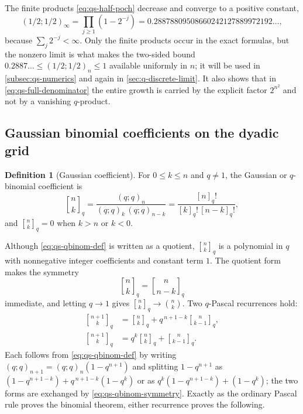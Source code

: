 \documentclass[11pt,oneside]{article}
\theoremstyle{definition}
\newtheorem{definition}[theorem]{Definition}
\theoremstyle{remark}
\newcommand{\qbinom}[3]{\genfrac{[}{]}{0pt}{}{#1}{#2}_{#3}}
\begin{document}
The finite products \eqref{eq:qs-half-poch} decrease and converge to a positive constant,
\begin{equation}
 (1/2;1/2)_\infty=\prod_{j\ge1}\left(1-2^{-j}\right)
 =0.28878809508660242127889972192\ldots,                  \label{eq:qs-half-poch-infinite}
\end{equation}
because $\sum_j2^{-j}<\infty$.  Only the finite products occur in the exact formulas, but the
nonzero limit is what makes the two-sided bound
$0.2887\ldots\le(1/2;1/2)_n\le1$ available uniformly in $n$; it will be used in
\cref{subsec:qs-numerics} and again in \cref{sec:q-discrete-limit}.  It also shows that in
\eqref{eq:qs-full-denominator} the entire growth is carried by the explicit factor $2^{n^2}$
and not by a vanishing $q$-product.

\subsection{Gaussian binomial coefficients on the dyadic grid}
\label{subsec:qs-gaussian}

\begin{definition}[Gaussian coefficient]
For $0\le k\le n$ and $q\ne1$, the Gaussian or $q$-binomial coefficient is
\begin{equation}
 \qbinom nkq=\frac{(q;q)_n}{(q;q)_k\,(q;q)_{n-k}}
 =\frac{[n]_q!}{[k]_q!\,[n-k]_q!},                        \label{eq:qs-qbinom-def}
\end{equation}
and $\qbinom nkq=0$ when $k>n$ or $k<0$.
\end{definition}

Although \eqref{eq:qs-qbinom-def} is written as a quotient, $\qbinom nkq$ is a polynomial in
$q$ with nonnegative integer coefficients and constant term $1$.  The quotient form makes the
symmetry
\begin{equation}
 \qbinom nkq=\qbinom n{n-k}q                              \label{eq:qs-qbinom-symmetry}
\end{equation}
immediate, and letting $q\to1$ gives $\qbinom nkq\to\binom nk$.  Two $q$-Pascal recurrences
hold:
\begin{align}
 \qbinom{n+1}kq&=\qbinom nkq+q^{\,n+1-k}\qbinom n{k-1}q,  \label{eq:qs-qpascal-one}\\
 \qbinom{n+1}kq&=q^{k}\qbinom nkq+\qbinom n{k-1}q.        \label{eq:qs-qpascal-two}
\end{align}
Each follows from \eqref{eq:qs-qbinom-def} by writing $(q;q)_{n+1}=(q;q)_n(1-q^{n+1})$ and
splitting $1-q^{n+1}$ as $(1-q^{n+1-k})+q^{\,n+1-k}(1-q^{k})$ or as
$q^{k}(1-q^{n+1-k})+(1-q^{k})$; the two forms are exchanged by
\eqref{eq:qs-qbinom-symmetry}.  Exactly as the ordinary Pascal rule proves the binomial
theorem, either recurrence proves the following.
\end{document}

